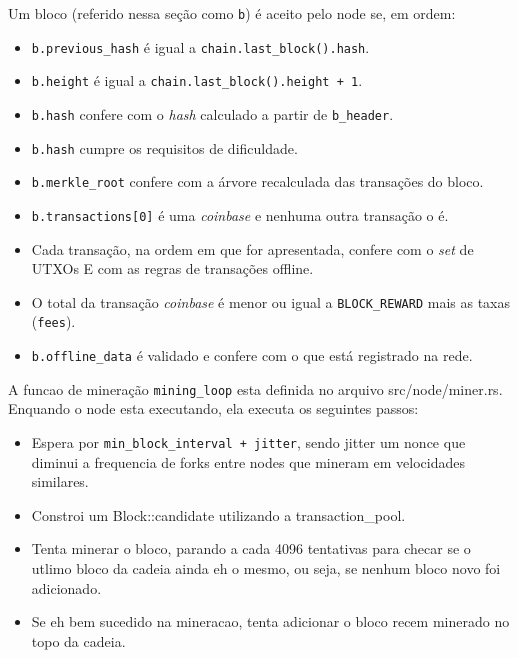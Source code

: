 \documentclass[
  12pt,
  a4paper,
  oneside,
  article,
]{abntex2}
\begin{document}

Um bloco (referido nessa seção como \texttt{b}) é aceito pelo node se, em ordem:

\begin{itemize}
	\item \texttt{b.previous\_hash} é igual a \texttt{chain.last\_block().hash}.
	\item \texttt{b.height} é igual a \texttt{chain.last\_block().height + 1}.
	\item \texttt{b.hash} confere com o \textit{hash} calculado a partir de \texttt{b\_header}.
	\item \texttt{b.hash} cumpre os requisitos de dificuldade.
	\item \texttt{b.merkle\_root} confere com a árvore recalculada das transações do bloco.
	\item \texttt{b.transactions[0]} é uma \textit{coinbase} e nenhuma outra transação o é.
	\item Cada transação, na ordem em que for apresentada, confere com o \textit{set} de UTXOs E com as regras de transações offline.
	\item O total da transação \textit{coinbase} é menor ou igual a \texttt{BLOCK\_REWARD} mais as taxas (\texttt{fees}).
	\item \texttt{b.offline\_data} é validado e confere com o que está registrado na rede.
\end{itemize}


A funcao de mineração \texttt{mining_loop} esta definida no arquivo src/node/miner.rs. Enquando o node esta executando, ela executa os seguintes passos:

\begin{itemize}
	\item Espera por \texttt{min_block_interval + jitter}, sendo jitter um nonce que diminui a frequencia de forks entre nodes que mineram em velocidades similares.
	\item Constroi um Block::candidate utilizando a transaction_pool.
	\item Tenta minerar o bloco, parando a cada 4096 tentativas para checar se o utlimo bloco da cadeia ainda eh o mesmo, ou seja, se nenhum bloco novo foi adicionado.
	\item Se eh bem sucedido na mineracao, tenta adicionar o bloco recem minerado no topo da cadeia.
\end{itemize}
\end{document}
